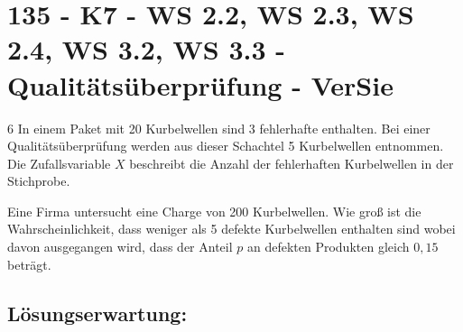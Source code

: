 \section{135 - K7 - WS 2.2, WS 2.3, WS 2.4, WS 3.2, WS 3.3 - Qualitätsüberprüfung - VerSie}

\begin{langesbeispiel} \item[6] %
In einem Paket mit 20 Kurbelwellen sind 3 fehlerhafte enthalten. Bei einer Qualitätsüberprüfung werden aus dieser Schachtel 5 Kurbelwellen entnommen. Die Zufallsvariable $X$ beschreibt die Anzahl der fehlerhaften Kurbelwellen in der Stichprobe.%

\begin{aufgabenstellung}
\item %


\item %


\item Eine Firma untersucht eine Charge von 200 Kurbelwellen. Wie groß ist die Wahrscheinlichkeit, dass weniger als 5 defekte Kurbelwellen enthalten sind wobei davon ausgegangen wird, dass der Anteil $p$ an defekten Produkten gleich $0,15$ beträgt.%


\end{aufgabenstellung}

\begin{loesung}
\item \subsection{Lösungserwartung:} 

\end{loesung}
\end{langesbeispiel}
